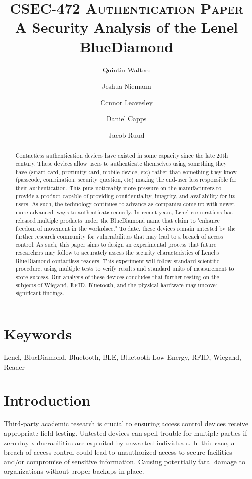 \documentclass[10pt,twocolumn,letterpaper]{article}
\title{
		\vspace{-1in}
		\usefont{OT1}{bch}{b}{n}
		\normalfont \normalsize \textsc{CSEC-472 Authentication Paper} \\ [14pt]
		\huge A Security Analysis of the Lenel BlueDiamond \\
}
\author[1]{Quintin Walters}
\author[1]{Joshua Niemann}
\author[1]{Connor Leavesley}
\author[1]{Daniel Capps}
\author[1]{Jacob Ruud}
\affil[1]{\small{Computing Security, Rochester Institute of Technology}}
\begin{document}
\maketitle
{}
\begin{abstract}
Contactless authentication devices have existed in some capacity since the late 20th century. These devices allow users to authenticate themselves using something they have (smart card, proximity card, mobile device, etc) rather than something they know (passcode, combination, security question, etc) making the end-user less responsible for their authentication. This puts noticeably more pressure on the manufacturers to provide a product capable of providing confidentiality, integrity, and availability for its users. As such, the technology continues to advance as companies come up with newer, more advanced, ways to authenticate securely. In recent years, Lenel corporations has released multiple products under the BlueDiamond name that claim to "enhance freedom of movement in the workplace." \cite{lenelbluediamondwebsite} To date, these devices remain untested by the further research community for vulnerabilities that may lead to a breach of access control. As such, this paper aims to design an experimental process that future researchers may follow to accurately assess the security characteristics of Lenel's BlueDiamond contactless readers. This experiment will follow standard scientific procedure, using multiple tests to verify results and standard units of measurement to score success. Our analysis of these devices concludes that further testing on the subjects of Wiegand, RFID, Bluetooth, and the physical hardware may uncover significant findings.
\end{abstract}

\section*{Keywords}
Lenel, BlueDiamond, Bluetooth, BLE, Bluetooth Low Energy, RFID, Wiegand, Reader

\section{Introduction}
Third-party academic research is crucial to ensuring access control devices receive appropriate field testing. Untested devices can spell trouble for multiple parties if zero-day vulnerabilities are exploited by unwanted individuals. In this case, a breach of access control could lead to unauthorized access to secure facilities and/or compromise of sensitive information. Causing potentially fatal damage to organizations without proper backups in place.
\end{document}
